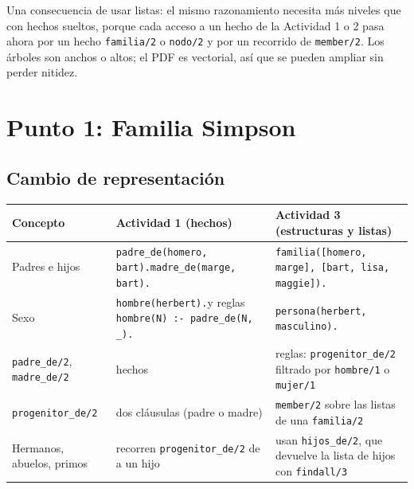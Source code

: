 \documentclass[12pt]{report}
\begin{document}
Una consecuencia de usar listas: el mismo razonamiento necesita más niveles
que con hechos sueltos, porque cada acceso a un hecho de la Actividad 1 o 2
pasa ahora por un hecho \texttt{familia/2} o \texttt{nodo/2} y por un
recorrido de \texttt{member/2}. Los árboles son anchos o altos; el PDF es
vectorial, así que se pueden ampliar sin perder nitidez.

\newpage


\chapter{Punto 1: Familia Simpson}

\section{Cambio de representación}

\begin{table}[H]
    \centering
    \small
    \renewcommand{\arraystretch}{1.3}
    \begin{tabular}{>{\raggedright\arraybackslash}p{3.8cm} >{\raggedright\arraybackslash}p{5.3cm} >{\raggedright\arraybackslash}p{5.3cm}}
        \toprule
        \textbf{Concepto} & \textbf{Actividad 1 (hechos)} & \textbf{Actividad 3 (estructuras y listas)} \\
        \midrule
        Padres e hijos & \texttt{padre\_de(homero, bart).}\newline \texttt{madre\_de(marge, bart).}
                       & \texttt{familia([homero, marge], [bart, lisa, maggie]).} \\
        Sexo & \texttt{hombre(herbert).}\newline y reglas \texttt{hombre(N) :- padre\_de(N, \_).}
             & \texttt{persona(herbert, masculino).} \\
        \texttt{padre\_de/2}, \texttt{madre\_de/2} & hechos
             & reglas: \texttt{progenitor\_de/2} filtrado por \texttt{hombre/1} o \texttt{mujer/1} \\
        \texttt{progenitor\_de/2} & dos cláusulas (padre o madre)
             & \texttt{member/2} sobre las listas de una \texttt{familia/2} \\
        Hermanos, abuelos, primos & recorren \texttt{progenitor\_de/2} de a un hijo
             & usan \texttt{hijos\_de/2}, que devuelve la lista de hijos con \texttt{findall/3} \\
        \bottomrule
    \end{tabular}
\end{table}
\end{document}
